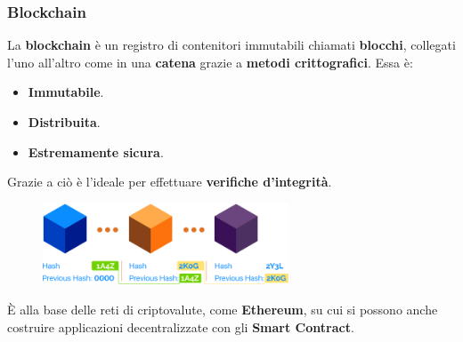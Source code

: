\documentclass{beamer}
\begin{document}
\begin{frame}
	\frametitle{Blockchain}
	La \textbf{blockchain} è un registro di
	contenitori immutabili chiamati \textbf{blocchi}, collegati l'uno all'altro come in una
	\textbf{catena} grazie a \textbf{metodi crittografici}.
	Essa è:
	\begin{itemize}
		\item \textbf{Immutabile}.
		\item \textbf{Distribuita}.
		\item \textbf{Estremamente sicura}.
	\end{itemize}
	Grazie a ciò è l'ideale per effettuare \textbf{verifiche d'integrità}.
	\begin{figure}
		\includegraphics[width=0.65\textwidth]{figures/blockchain.png}
	\end{figure}
	\pause
	È alla base delle reti di criptovalute, come \textbf{Ethereum},
	su cui si possono anche costruire applicazioni decentralizzate con gli
	\textbf{Smart Contract}.
\end{frame}


\end{document}
